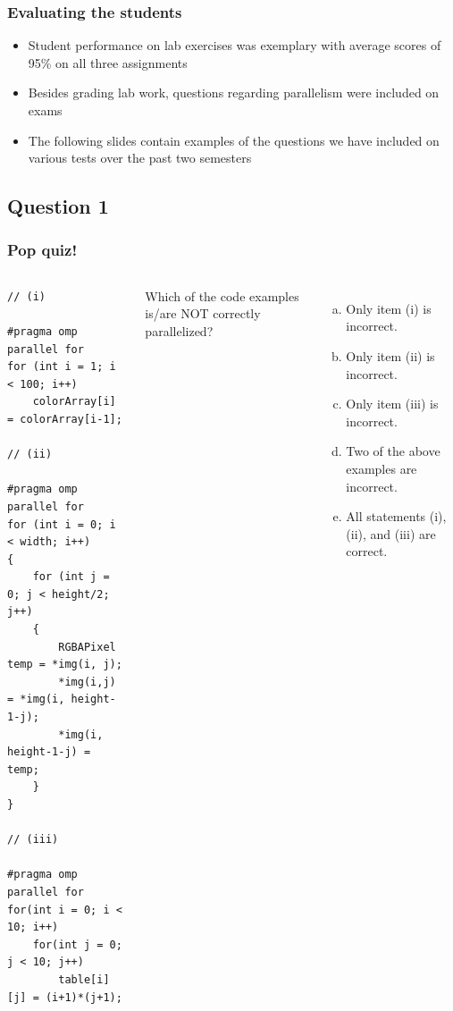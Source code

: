 \documentclass[table]{beamer}
\begin{document}
\begin{frame}
    \frametitle{Evaluating the students}
    \begin{itemize}
        \item Student performance on lab exercises was exemplary with average
            scores of 95\% on all three assignments
        \item Besides grading lab work, questions regarding parallelism were
            included on exams
        \item The following slides contain examples of the questions we have
            included on various tests over the past two semesters
    \end{itemize}
\end{frame}

\subsection{Question 1}

\begin{frame}[fragile]
    \frametitle{Pop quiz!}

    \begin{columns}

    \begin{verbatim}
// (i)

#pragma omp parallel for
for (int i = 1; i < 100; i++)
    colorArray[i] = colorArray[i-1];

// (ii)

#pragma omp parallel for
for (int i = 0; i < width; i++)
{
    for (int j = 0; j < height/2; j++)
    {
        RGBAPixel temp = *img(i, j);
        *img(i,j) = *img(i, height-1-j);
        *img(i, height-1-j) = temp;
    }
}

// (iii)    

#pragma omp parallel for
for(int i = 0; i < 10; i++)
    for(int j = 0; j < 10; j++)
        table[i][j] = (i+1)*(j+1); 
    \end{verbatim}

    Which of the code examples is/are NOT correctly parallelized?
    {\small
    \begin{enumerate}[(a)]
        \item Only item (i) is incorrect.
        \item Only item (ii) is incorrect.
        \item Only item (iii) is incorrect.
        \item Two of the above examples are incorrect.
        \item All statements (i), (ii), and (iii) are correct.
    \end{enumerate}
    }
    \end{columns}

\end{frame}
\end{document}
